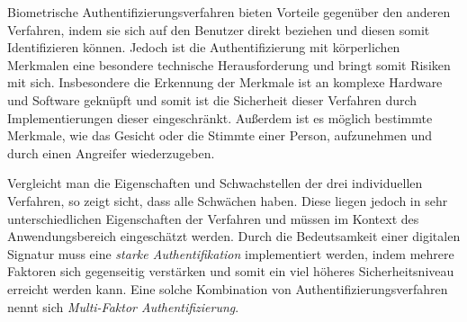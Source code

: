 \documentclass[11pt,a4paper,ngerman]{scrreprt}
\begin{document}
\begin{description}[font=\rmfamily]
    \item[Biometrie:] Biometrische Authentifizierungsverfahren bieten Vorteile gegenüber den anderen Verfahren, indem sie sich auf den Benutzer direkt beziehen und diesen somit Identifizieren können. Jedoch ist die Authentifizierung mit körperlichen Merkmalen eine besondere technische Herausforderung und bringt somit Risiken mit sich. Insbesondere die Erkennung der Merkmale ist an komplexe Hardware und Software geknüpft und somit ist die Sicherheit dieser Verfahren durch Implementierungen dieser eingeschränkt. Außerdem ist es möglich bestimmte Merkmale, wie das Gesicht oder die Stimmte einer Person, aufzunehmen und durch einen Angreifer wiederzugeben.
\end{description}
Vergleicht man die Eigenschaften und Schwachstellen der drei individuellen Verfahren, so zeigt sicht, dass alle Schwächen haben. Diese liegen jedoch in sehr unterschiedlichen Eigenschaften der Verfahren und müssen im Kontext des Anwendungsbereich eingeschätzt werden. Durch die Bedeutsamkeit einer digitalen Signatur muss eine \emph{starke Authentifikation} implementiert werden, indem mehrere Faktoren sich gegenseitig verstärken und somit ein viel höheres Sicherheitsniveau erreicht werden kann. Eine solche Kombination von Authentifizierungsverfahren nennt sich \emph{Multi-Faktor Authentifizierung}.
\begingroup
\renewcommand{\arraystretch}{1.2}
\end{document}
